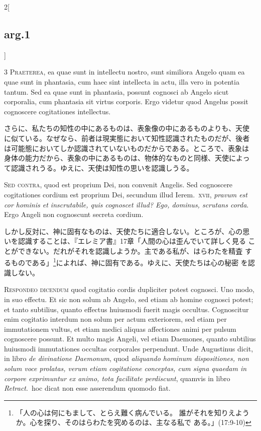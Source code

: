 \documentclass[paper=a4paper,fontsize=10pt,jafontsize=9pt,titlepage]{jlreq}
\begin{document}
\begin{paracol}{2}[\subsection{arg.1}]

{\scshape 3 Praeterea}, ea quae sunt in intellectu nostro, sunt
similiora Angelo quam ea quae sunt in phantasia, cum haec sint
intellecta in actu, illa vero in potentia tantum. Sed ea quae sunt in
phantasia, possunt cognosci ab Angelo sicut corporalia, cum phantasia
sit virtus corporis. Ergo videtur quod Angelus possit cognoscere
cogitationes intellectus.

\switchcolumn

さらに、私たちの知性の中にあるものは、表象像の中にあるものよりも、天使
に似ている。なぜなら、前者は現実態において知性認識されたものだが、後者
は可能態においてしか認識されていないものだからである。ところで、表象は
身体の能力だから、表象の中にあるものは、物体的なものと同様、天使によっ
て認識されうる。ゆえに、天使は知性の思いを認識しうる。

\switchcolumn*[\subsection{s.c.}]

{\scshape Sed contra}, quod est proprium Dei, non convenit
Angelis. Sed cognoscere cogitationes cordium est proprium Dei,
secundum illud Ierem.~{\scshape xvii}, {\itshape pravum est cor
hominis et inscrutabile, quis cognoscet illud? Ego, dominus, scrutans
corda}. Ergo Angeli non cognoscunt secreta cordium.

\switchcolumn

しかし反対に、神に固有なものは、天使たちに適合しない。ところが、心の思
いを認識することは、『エレミア書』17章「人間の心は歪んでいて詳しく見る
ことができない。だれがそれを認識しようか。主である私が、はらわたを精査
するものである」\footnote{「人の心は何にもまして、とらえ難く病んでいる。
誰がそれを知りえようか。心を探り、そのはらわたを究めるのは、主なる私で
ある。」(17:9-10)}によれば、神に固有である。ゆえに、天使たちは心の秘密
を認識しない。


{\scshape Respondeo dicendum} quod cogitatio cordis dupliciter potest
cognosci. Uno modo, in suo effectu. Et sic non solum ab Angelo, sed
etiam ab homine cognosci potest; et tanto subtilius, quanto effectus
huiusmodi fuerit magis occultus. Cognoscitur enim cogitatio interdum
non solum per actum exteriorem, sed etiam per immutationem vultus, et
etiam medici aliquas affectiones animi per pulsum cognoscere
possunt. Et multo magis Angeli, vel etiam Daemones, quanto subtilius
huiusmodi immutationes occultas corporales perpendunt. Unde Augustinus
dicit, in libro {\itshape de divinatione Daemonum}, quod {\itshape
aliquando hominum dispositiones, non solum voce prolatas, verum etiam
cogitatione conceptas, cum signa quaedam in corpore exprimuntur ex
animo, tota facilitate perdiscunt}, quamvis in libro {\itshape
Retract}.~hoc dicat non esse asserendum quomodo fiat.


\end{paracol}
\end{document}
